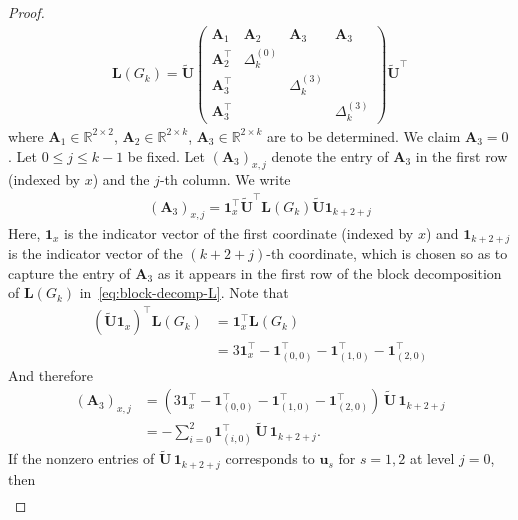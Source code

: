 \documentclass[11pt,a4paper]{amsart}
\begin{document}
\begin{proof}
\begin{align}
            \mathbf{L}(G_k) = \widetilde{\mathbf{U}} \begin{pmatrix} 
            \mathbf{A}_1 & \mathbf{A}_2 & \mathbf{A}_3 & \mathbf{A}_3\\
            \mathbf{A}_2^\top &\Delta_k^{(0)} & & \\
            \mathbf{A}_3^\top && \Delta_k^{(3)} & \\
            \mathbf{A}_3^\top && & \Delta_k^{(3)}
        \end{pmatrix} \widetilde{\mathbf{U}}^\top
        \end{align}
    where $\mathbf{A}_1\in\mathbb{R}^{2\times 2}$, $\mathbf{A}_2\in\mathbb{R}^{2\times k}$, $\mathbf{A}_3\in\mathbb{R}^{2\times k}$ are to be determined. We claim $\mathbf{A}_3=0$. Let $0\leq j \leq k-1$ be fixed. Let $(\mathbf{A}_3)_{x, j}$ denote the entry of $\mathbf{A}_3$ in the first row (indexed by $x$) and the $j$-th column. We write
        \begin{align*}
            (\mathbf{A}_3)_{x, j} = \mathbf{1}_x^\top \widetilde{\mathbf{U}}^\top \mathbf{L}(G_k)\widetilde{\mathbf{U}} \mathbf{1}_{k+2+j}
        \end{align*}
    Here, $\mathbf{1}_x$ is the indicator vector of the first coordinate (indexed by $x$) and $\mathbf{1}_{k+2+j}$ is the indicator vector of the $(k+2+j)$-th coordinate, which is chosen so as to capture the entry of $\mathbf{A}_3$ as it appears in the first row of the block decomposition of $\mathbf{L}(G_k)$ in~\cref{eq:block-decomp-L}. Note that
        \begin{align*}
            (\widetilde{\mathbf{U}}\mathbf{1}_x)^\top \mathbf{L}(G_k) &= \mathbf{1}_x^\top \mathbf{L}(G_k)\\
            &= 3\mathbf{1}_x^\top - \mathbf{1}_{(0, 0)}^\top - \mathbf{1}_{(1, 0)}^\top - \mathbf{1}_{(2, 0)}^\top
        \end{align*}
    And therefore
        \begin{align*}
            (\mathbf{A}_3)_{x,j}
            &=(3\mathbf{1}_x^\top - \mathbf{1}_{(0,0)}^\top - \mathbf{1}_{(1,0)}^\top - \mathbf{1}_{(2,0)}^\top)\,\widetilde{\mathbf{U}}\,\mathbf{1}_{k+2+j}\\
            &=-\sum_{i=0}^2 \mathbf{1}_{(i,0)}^\top\,\widetilde{\mathbf{U}}\,\mathbf{1}_{k+2+j}.
        \end{align*}
    If the nonzero entries of $\widetilde{\mathbf{U}}\,\mathbf{1}_{k+2+j}$ corresponds to $\mathbf{u}_s$ for $s=1,2$ at level $j=0$, then
        \begin{align*}

\end{align*}
\end{proof}
\end{document}
